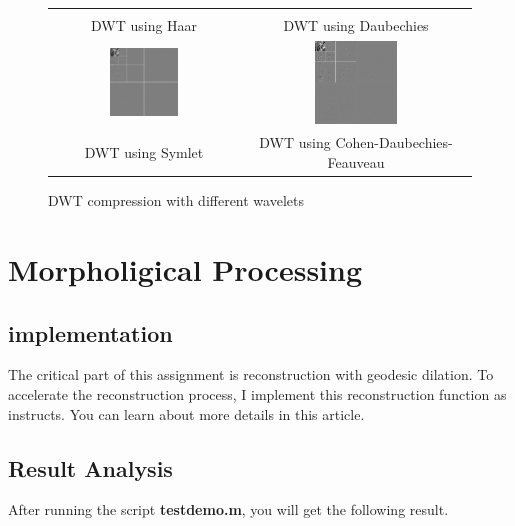 \documentclass[11pt,a4paper]{article}
\begin{document}
\begin{figure}[!htbp]
\begin{tabular}{cccc}
{		}\\
		\multicolumn{2}{c}{
			DWT using Haar
		}&
		\multicolumn{2}{c}{
			DWT using Daubechies
		}\\
		\multicolumn{2}{c}{
			\includegraphics[width=0.38\textwidth]{pro7/dwt/sym_dwt}
		}&
		\multicolumn{2}{c}{
			\includegraphics[width=0.38\textwidth]{pro7/dwt/cdf_dwt}
		}\\
		\multicolumn{2}{c}{
			DWT using Symlet
		}&
		\multicolumn{2}{c}{
			DWT using Cohen-Daubechies-Feauveau
		}
	\end{tabular}
	\caption{DWT compression with different wavelets}
	\label{pro7_fig4}
\end{figure}

\newpage
\newpage
\section{Morpholigical Processing}
\subsection{implementation}
The critical part of this assignment is reconstruction with geodesic dilation.
To accelerate the reconstruction process, I implement this reconstruction function 
as \cite{vincent} instructs. You can learn about more details in this article.

\subsection{Result Analysis}
After running the script \textbf{testdemo.m}, you will get the following result.
\end{document}
